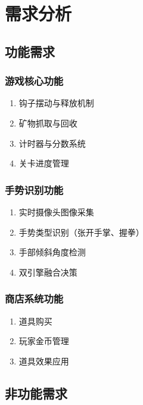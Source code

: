 \documentclass{article}
\begin{document}
\newpage

\section{需求分析}

\subsection{功能需求}

\subsubsection{游戏核心功能}

\begin{enumerate}[leftmargin=*]
    \item 钩子摆动与释放机制
    \item 矿物抓取与回收
    \item 计时器与分数系统
    \item 关卡进度管理
\end{enumerate}

\subsubsection{手势识别功能}

\begin{enumerate}[leftmargin=*]
    \item 实时摄像头图像采集
    \item 手势类型识别（张开手掌、握拳）
    \item 手部倾斜角度检测
    \item 双引擎融合决策
\end{enumerate}

\subsubsection{商店系统功能}

\begin{enumerate}[leftmargin=*]
    \item 道具购买
    \item 玩家金币管理
    \item 道具效果应用
\end{enumerate}

\subsection{非功能需求}
\end{document}
